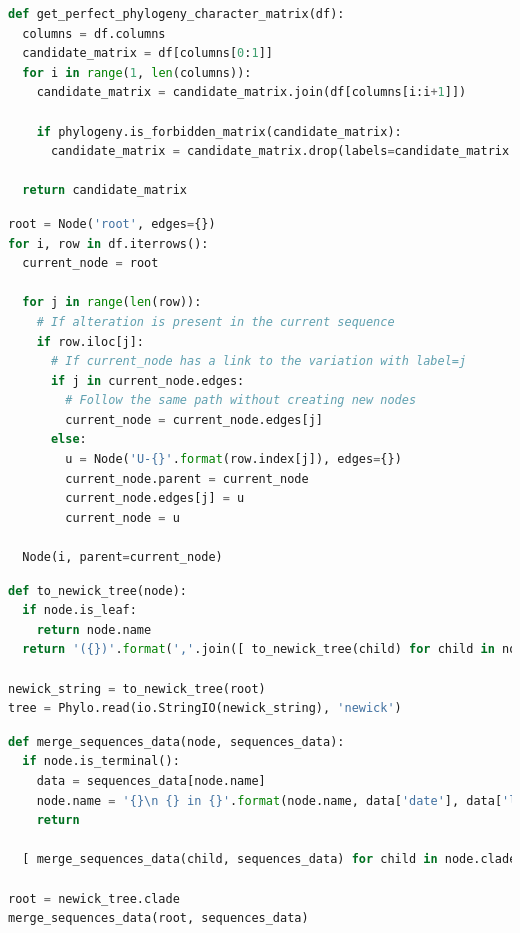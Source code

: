 \documentclass[11pt,italian]{article}
\begin{document}
\begin{lstlisting}[caption=Funzione di generazione della matrice binaria per filogenesi perfetta,label=code:get_perfect_phylogeny_function,language=Python]
def get_perfect_phylogeny_character_matrix(df):
  columns = df.columns
  candidate_matrix = df[columns[0:1]]
  for i in range(1, len(columns)):
    candidate_matrix = candidate_matrix.join(df[columns[i:i+1]])

    if phylogeny.is_forbidden_matrix(candidate_matrix):
      candidate_matrix = candidate_matrix.drop(labels=candidate_matrix.columns[-1], axis=1)

  return candidate_matrix
\end{lstlisting}

\begin{lstlisting}[caption=Funzione di creazione dell'albero,label=code:tree_creation_function,language=Python]
root = Node('root', edges={})
for i, row in df.iterrows():
  current_node = root

  for j in range(len(row)):
    # If alteration is present in the current sequence
    if row.iloc[j]:
      # If current_node has a link to the variation with label=j
      if j in current_node.edges:
        # Follow the same path without creating new nodes
        current_node = current_node.edges[j]
      else:
        u = Node('U-{}'.format(row.index[j]), edges={})
        current_node.parent = current_node
        current_node.edges[j] = u
        current_node = u

  Node(i, parent=current_node)
\end{lstlisting}

\begin{lstlisting}[caption=Funzione di conversione in Newick Tree,label=code:newick_tree_function,language=Python]
def to_newick_tree(node):
  if node.is_leaf:
    return node.name
  return '({})'.format(','.join([ to_newick_tree(child) for child in node.children ]))

newick_string = to_newick_tree(root)
tree = Phylo.read(io.StringIO(newick_string), 'newick')
\end{lstlisting}

\begin{lstlisting}[caption=Funzione per l'inserimento dei dati nelle foglie dell'albero,label=code:merge_sequence_data_function,language=Python]
def merge_sequences_data(node, sequences_data):
  if node.is_terminal():
    data = sequences_data[node.name]
    node.name = '{}\n {} in {}'.format(node.name, data['date'], data['location'])
    return

  [ merge_sequences_data(child, sequences_data) for child in node.clades ]

root = newick_tree.clade
merge_sequences_data(root, sequences_data)
\end{lstlisting}
\end{document}

